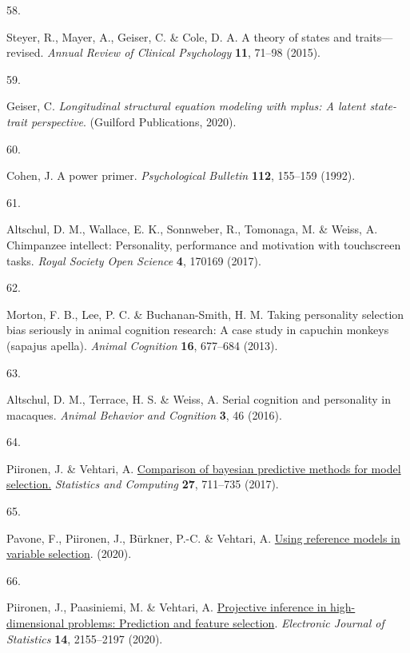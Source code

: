\documentclass[
  man,floatsintext]{apa6}
\newlength{\cslhangindent}
\newlength{\csllabelwidth}
\newlength{\cslentryspacingunit} %
\newenvironment{CSLReferences}[2] %
 {%
  \setlength{\parindent}{0pt}
  \ifodd #1
  \let\oldpar\par
  \def\par{\hangindent=\cslhangindent\oldpar}
  \fi
  \setlength{\parskip}{#2\cslentryspacingunit}
 }%
 {}
\newcommand{\CSLLeftMargin}[1]{\parbox[t]{\csllabelwidth}{#1}}
\newcommand{\CSLRightInline}[1]{\parbox[t]{\linewidth - \csllabelwidth}{#1}\break}
\begin{document}
\begin{CSLReferences}{0}{0}
\leavevmode{}%
\CSLLeftMargin{58. }%
\CSLRightInline{Steyer, R., Mayer, A., Geiser, C. \& Cole, D. A. A theory of states and traits---revised. \emph{Annual Review of Clinical Psychology} \textbf{11}, 71--98 (2015).}

\leavevmode{}%
\CSLLeftMargin{59. }%
\CSLRightInline{Geiser, C. \emph{Longitudinal structural equation modeling with mplus: A latent state-trait perspective}. (Guilford Publications, 2020).}

\leavevmode{}%
\CSLLeftMargin{60. }%
\CSLRightInline{Cohen, J. A power primer. \emph{Psychological Bulletin} \textbf{112}, 155--159 (1992).}

\leavevmode{}%
\CSLLeftMargin{61. }%
\CSLRightInline{Altschul, D. M., Wallace, E. K., Sonnweber, R., Tomonaga, M. \& Weiss, A. Chimpanzee intellect: Personality, performance and motivation with touchscreen tasks. \emph{Royal Society Open Science} \textbf{4}, 170169 (2017).}

\leavevmode{}%
\CSLLeftMargin{62. }%
\CSLRightInline{Morton, F. B., Lee, P. C. \& Buchanan-Smith, H. M. Taking personality selection bias seriously in animal cognition research: A case study in capuchin monkeys (sapajus apella). \emph{Animal Cognition} \textbf{16}, 677--684 (2013).}

\leavevmode{}%
\CSLLeftMargin{63. }%
\CSLRightInline{Altschul, D. M., Terrace, H. S. \& Weiss, A. Serial cognition and personality in macaques. \emph{Animal Behavior and Cognition} \textbf{3}, 46 (2016).}

\leavevmode{}%
\CSLLeftMargin{64. }%
\CSLRightInline{Piironen, J. \& Vehtari, A. \href{https://doi.org/10.1007/s11222-016-9649-y}{Comparison of bayesian predictive methods for model selection.} \emph{Statistics and Computing} \textbf{27}, 711--735 (2017).}

\leavevmode{}%
\CSLLeftMargin{65. }%
\CSLRightInline{Pavone, F., Piironen, J., Bürkner, P.-C. \& Vehtari, A. \href{https://arxiv.org/abs/2004.13118}{Using reference models in variable selection}. (2020).}

\leavevmode{}%
\CSLLeftMargin{66. }%
\CSLRightInline{Piironen, J., Paasiniemi, M. \& Vehtari, A. \href{https://doi.org/10.1214/20-EJS1711}{{Projective inference in high-dimensional problems: Prediction and feature selection}}. \emph{Electronic Journal of Statistics} \textbf{14}, 2155--2197 (2020).}


\end{CSLReferences}
\end{document}
